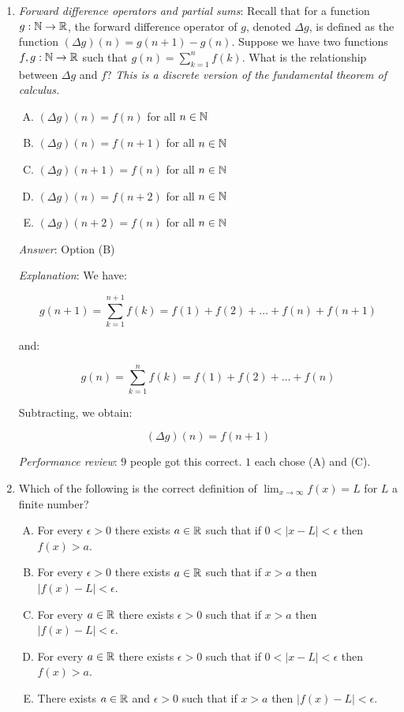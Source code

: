 \documentclass[10pt]{amsart}
\begin{document}
\begin{enumerate}
\item {\em Forward difference operators and partial sums}: Recall that
  for a function $g: \mathbb{N} \to \mathbb{R}$, the forward difference operator of
  $g$, denoted $\Delta g$, is defined as the function $(\Delta g)(n) =
  g(n+1) - g(n)$. Suppose we have two functions $f,g: \mathbb{N} \to \mathbb{R}$ such
  that $g(n) = \sum_{k=1}^n f(k)$. What is the relationship between
  $\Delta g$ and $f$? {\em This is a discrete version of the
  fundamental theorem of calculus.}

  \begin{enumerate}[(A)]
  \item $(\Delta g)(n) = f(n)$ for all $n \in \mathbb{N}$
  \item $(\Delta g)(n) = f(n + 1)$ for all $n \in \mathbb{N}$
  \item $(\Delta g)(n + 1) = f(n)$ for all $n \in \mathbb{N}$
  \item $(\Delta g)(n) = f(n + 2)$ for all $n \in \mathbb{N}$
  \item $(\Delta g)(n + 2) = f(n)$ for all $n \in \mathbb{N}$
  \end{enumerate}

  {\em Answer}: Option (B)

  {\em Explanation}: We have:

  $$g(n+1) = \sum_{k=1}^{n+1} f(k) = f(1) + f(2) + \dots + f(n) + f(n + 1)$$

  and:

  $$g(n) = \sum_{k=1}^n f(k) = f(1) + f(2) + \dots + f(n)$$

  Subtracting, we obtain:

  $$(\Delta g)(n) = f(n + 1)$$

  {\em Performance review}: $9$ people got this correct. $1$ each
  chose (A) and (C).
\item Which of the following is the correct definition of $\lim_{x \to
  \infty} f(x) = L$ for $L$ a finite number?

  \begin{enumerate}[(A)]
  \item For every $\epsilon > 0$ there exists $a \in \mathbb{R}$ such that if
    $0 < |x - L| < \epsilon$ then $f(x) > a$.
  \item For every $\epsilon > 0$ there exists $a \in \mathbb{R}$ such that if
    $x > a$ then $|f(x) - L| < \epsilon$.
  \item For every $a \in \mathbb{R}$ there exists $\epsilon > 0$ such that if
    $x > a$ then $|f(x) - L| < \epsilon$.
  \item For every $a \in \mathbb{R}$ there exists $\epsilon > 0$ such that if
    $0 < |x - L| < \epsilon$ then $f(x) > a$.
  \item There exists $a \in \mathbb{R}$ and $\epsilon > 0$ such that if $x >
    a$ then $|f(x) - L| < \epsilon$.
  \end{enumerate}


\end{enumerate}
\end{document}
